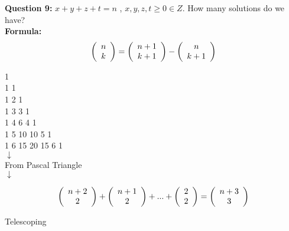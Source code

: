 \documentclass[11pt]{article}
\begin{document}
\textbf{Question 9: }  $x+y+z+t = n$ , $x,y,z,t \geq 0 \in Z$. How many solutions do we have?
\\ %

\textbf{Formula: }  $$\left( {\begin{array}{*{20}c} n  \\ k  \\ \end{array}} \right) = \left( {\begin{array}{*{20}c} n+1  \\ k+1  \\ \end{array}} \right) - \left( {\begin{array}{*{20}c} n  \\ k+1  \\ \end{array}} \right)$$

\begin{center}
1\\1 1\\1 2 1\\1 3 3 1\\1 4 6 4 1\\1 5 10 10 5 1\\1 6 15 20 15 6 1\\
$\downarrow$\\
From Pascal Triangle\\
$\downarrow$
\end{center}

$$\left( {\begin{array}{*{20}c} n+2  \\ 2  \\ \end{array}} \right) + \left( {\begin{array}{*{20}c} n+1  \\ 2  \\ \end{array}} \right) + ... + \left( {\begin{array}{*{20}c} 2  \\ 2  \\ \end{array}} \right) = \left( {\begin{array}{*{20}c} n+3 \\ 3  \\ \end{array}} \right)$$
\begin{center}
Telescoping
\end{center}
\end{document}
